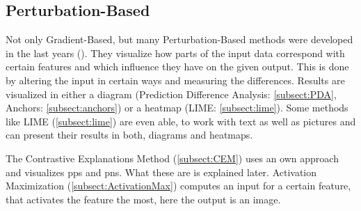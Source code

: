 \subsection{Perturbation-Based}
Not only Gradient-Based, but many Perturbation-Based methods were developed in the last years (\cite{AmitDhurandhar.2018,Ribeiro.2018,Luss.,Kim.2018,Zintgraf.2017}). They visualize how parts of the input data correspond with certain features and which influence they have on the given output. This is done by altering the input in certain ways and measuring the differences. Results are visualized in either a diagram (Prediction Difference Analysis: \cref{subsect:PDA}, Anchors: \cref{subsect:anchors}) or a heatmap (LIME: \cref{subsect:lime}). Some methods like LIME (\cref{subsect:lime}) are even able, to work with text as well as pictures and can present their results in both, diagrams and heatmaps. 
\par
The Contrastive Explanations Method (\cref{subsect:CEM}) uses an own approach and visualizes \glspl{pp} and \glspl{pn}. What these are is explained later. Activation Maximization (\cref{subsect:ActivationMax}) computes an input for a certain feature, that activates the feature the most, here the output is an image.